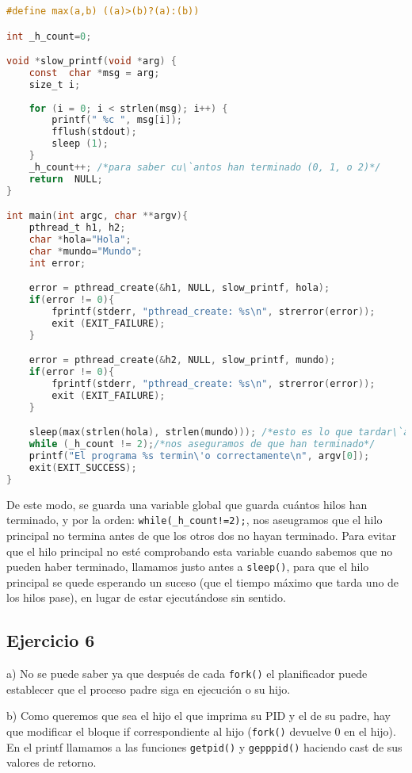 \documentclass{article}
\begin{document}
\begin{lstlisting}[language=C]
#define max(a,b) ((a)>(b)?(a):(b))

int _h_count=0;

void *slow_printf(void *arg) {
    const  char *msg = arg;
    size_t i;
    
    for (i = 0; i < strlen(msg); i++) {
        printf(" %c ", msg[i]);
        fflush(stdout);
        sleep (1);
    }    
    _h_count++; /*para saber cu\`antos han terminado (0, 1, o 2)*/
    return  NULL;
}

int main(int argc, char **argv){
    pthread_t h1, h2;
    char *hola="Hola";
    char *mundo="Mundo";
    int error;

    error = pthread_create(&h1, NULL, slow_printf, hola);
    if(error != 0){
        fprintf(stderr, "pthread_create: %s\n", strerror(error));
        exit (EXIT_FAILURE);
    }

    error = pthread_create(&h2, NULL, slow_printf, mundo);
    if(error != 0){
        fprintf(stderr, "pthread_create: %s\n", strerror(error));
        exit (EXIT_FAILURE);
    }

    sleep(max(strlen(hola), strlen(mundo))); /*esto es lo que tardar\`an como m\`inimo-evitamos que el hilo principal compruebe constantemente*/
    while (_h_count != 2);/*nos aseguramos de que han terminado*/
    printf("El programa %s termin\'o correctamente\n", argv[0]);
    exit(EXIT_SUCCESS);
}
\end{lstlisting}

De este modo, se guarda una variable global que guarda cuántos hilos han terminado, y por la orden: \texttt{while(\_h\_count!=2);}, nos aseugramos que el hilo principal no termina antes de que los otros dos no hayan terminado. Para evitar que el hilo principal no esté comprobando esta variable cuando sabemos que no pueden haber terminado, llamamos justo antes a \texttt{sleep()}, para que el hilo principal se quede esperando un suceso (que el tiempo máximo que tarda uno de los hilos pase), en lugar de estar ejecutándose sin sentido.

\subsection*{Ejercicio 6}

a) No se puede saber ya que después de cada \texttt{fork()} el planificador puede establecer que el proceso padre siga en ejecución o su hijo.

b) Como queremos que sea el hijo el que imprima su PID y el de su padre, hay que modificar el bloque if correspondiente al hijo (\texttt{fork()} devuelve 0 en el hijo). En el printf llamamos a las funciones \texttt{getpid()} y \texttt{gepppid()} haciendo cast de sus valores de retorno.
\end{document}
